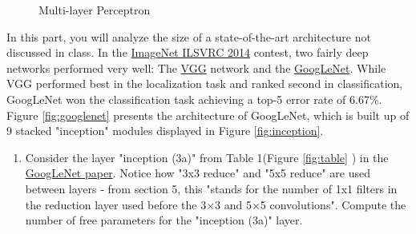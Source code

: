 \documentclass[a4paper]{article}
\begin{document}
\begin{enumerate}
\begin{enumerate}
\begin{figure}
				\caption{Multi-layer Perceptron}
				\label{fig:perceptron}
			\end{figure}
			\end{enumerate}
			
			In this part, you will analyze the size of a state-of-the-art architecture not discussed in class. In the \href{http://www.image-net.org/challenges/LSVRC/2014/results}{ImageNet ILSVRC 2014} contest, two fairly deep networks performed very well: The \href{https://arxiv.org/pdf/1409.1556.pdf}{VGG} network and the \href{https://www.cs.unc.edu/~wliu/papers/GoogLeNet.pdf}{GoogLeNet}. While VGG performed best in the localization task and ranked second in classification, GoogLeNet won the classification task achieving a top-5 error rate of 6.67\%. Figure \ref{fig:googlenet} presents the architecture of GoogLeNet, which is built up of 9 stacked "inception" modules displayed in Figure \ref{fig:inception}.
		
		\begin{enumerate}[resume]
			\item Consider the layer "inception (3a)" from Table 1(Figure \ref{fig:table} ) in the \href{https://www.cs.unc.edu/~wliu/papers/GoogLeNet.pdf}{GoogLeNet paper}. Notice how "3x3 reduce" and "5x5 reduce" are used between layers - from section 5, this "stands for the number of 1x1 filters in the reduction layer used before the 3×3 and 5×5 convolutions". Compute the number of free parameters for the "inception (3a)" layer.
			

\end{enumerate}
\end{enumerate}
\end{document}

